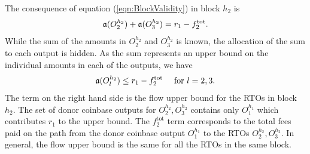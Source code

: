 The consequence of equation (\ref{eqn:BlockValidity}) in block $h_2$ is 
\begin{align}
  \mathfrak{a}(O_2^{h_2}) + \mathfrak{a}(O_3^{h_2}) = r_1 - f^{\text{tot}}_2.
\end{align}
While the sum of the amounts in $O_2^{h_2}$ and $O_3^{h_2}$ is known, the allocation of the sum to each output is hidden. As the sum represents an upper bound on the individual amounts in each of the outputs, we have
\begin{align}
  \mathfrak{a}(O_l^{h_2})\le r_1 - f^{\text{tot}}_2 \ \ \ \text{ for } l = 2,3.
  \label{eqn:UB1}
\end{align}
The term on the right hand side is the flow upper bound for the RTOs in block $h_2$. The set of donor coinbase outputs for $O_2^{h_2}, O_3^{h_2}$ contains only $O_1^{h_1}$ which contributes $r_1$ to the upper bound. The $f_2^{\text{tot}}$ term corresponds to the total fees paid on the path from the donor coinbase output $O_1^{h_1}$ to the RTOs $O_2^{h_2}, O_3^{h_2}$. In general, the flow upper bound is the same for all the RTOs in the same block.

